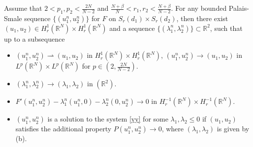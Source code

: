 \documentclass[reqno]{amsart}
\begin{document}
\begin{lemma}\label{zyy4}
Assume that $2<p_1,p_2<\frac{2N}{N-2}$ and 
$\frac{N+\beta}{N}<r_1,r_2<\frac{N+\beta}{N-2}$. For any bounded Palais-Smale sequence
$\{(u_1^n,u_2^n)\}$ for $F$ on $S_r(d_1)\times S_r(d_2)$, then there exist 
$(u_1,u_2)\in H_r^1(\mathbb{R}^N)\times H_r^1(\mathbb{R}^N)$ and a sequence
$\{(\lambda_1^n,\lambda_2^n)\}\subset\mathbb{R}^2$, such that up to a subsequence
\begin{itemize}
\item[(a)] $(u_1^n,u_2^n)\rightharpoonup (u_1,u_2)$ in 
 $H_r^1(\mathbb{R}^N)\times H_r^1(\mathbb{R}^N)$, 
 $(u_1^n,u_2^n)\to  (u_1,u_2)$ in $L^p
(\mathbb{R}^N)\times L^p(\mathbb{R}^N)$ for $p\in(2,\frac{2N}{N-2})$.

\item[(b)] $(\lambda_1^n,\lambda_2^n) \to  (\lambda_1,\lambda_2)$ in
 $(\mathbb{R}^2)$.
 
\item[(c)] $F'(u_1^n,u_2^n)-\lambda_1^n(u_1^n,0)-\lambda_2^n(0,u_2^n)\to 0$
 in $H_r^{-1}(\mathbb{R}^N)\times H_r^{-1}(\mathbb{R}^N)$.
 
\item[(d)] $(u_1^n,u_2^n)$ is a solution to the system \eqref{yy} for some 
 $\lambda_1,\lambda_2\leq0$ if $(u_1,u_2)$ satisfies the additional property
$P(u_1^n,u_2^n)\to 0$, where $(\lambda_1,\lambda_2)$ is given by (b).
\end{itemize}
\end{lemma}
\end{document}
